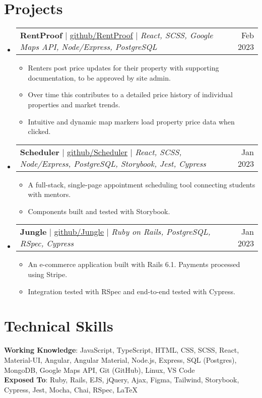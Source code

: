 \documentclass[letterpaper,11pt]{article}
\makeatletter
\newcommand{\resumeItem}[1]{
  \item\small{
    {#1 \vspace{-2pt}}
  }
}
\newcommand{\resumeProjectHeading}[2]{
    \item
    \begin{tabular*}{0.97\textwidth}{l@{\extracolsep{\fill}}r}
      \small#1 & #2 \\
    \end{tabular*}\vspace{-7pt}
}
\newcommand{\resumeSubHeadingListStart}{\begin{itemize}[leftmargin=0.15in, label={}]}
\newcommand{\resumeSubHeadingListEnd}{\end{itemize}}
\newcommand{\resumeItemListStart}{\begin{itemize}}
\newcommand{\resumeItemListEnd}{\end{itemize}\vspace{-5pt}}
\makeatother
\begin{document}
\section{Projects}
    \resumeSubHeadingListStart
      \resumeProjectHeading
          {\textbf{RentProof} $|$ 
          \href{https://github.com/JackDuluoz/RentProof}
          {\underline{github/RentProof}} $|$
          \emph{React, SCSS, Google Maps API, Node/Express, PostgreSQL}}{Feb 2023}
          \resumeItemListStart
            \resumeItem{Renters post price updates for their property with supporting documentation, to be approved by site admin.}
            \resumeItem{Over time this contributes to a detailed price history of individual properties and market trends.}
            \resumeItem{Intuitive and dynamic map markers load property price data when clicked.}
          \resumeItemListEnd
      \resumeProjectHeading
          {\textbf{Scheduler} $|$ 
          \href{https://github.com/JackDuluoz/scheduler}
          {\underline{github/Scheduler}} $|$
          \emph{React, SCSS, Node/Express, PostgreSQL, Storybook, Jest, Cypress}}{Jan 2023}
          \resumeItemListStart
            \resumeItem{A full-stack, single-page appointment scheduling tool connecting students with mentors.}
            \resumeItem{Components built and tested with Storybook.}
          \resumeItemListEnd
      \resumeProjectHeading
          {\textbf{Jungle} $|$ 
          \href{https://github.com/JackDuluoz/jungle-rails}
          {\underline{github/Jungle}} $|$
          \emph{Ruby on Rails, PostgreSQL, RSpec, Cypress}}{Jan 2023}
          \resumeItemListStart
            \resumeItem{An e-commerce application built with Rails 6.1. Payments processed using Stripe.}
            \resumeItem{Integration tested with RSpec and end-to-end tested with Cypress.}
          \resumeItemListEnd
    \resumeSubHeadingListEnd



%
\section{Technical Skills}
 \begin{itemize}[leftmargin=0.15in, label={}]
    \small{\item{
     \textbf{Working Knowledge}{: JavaScript, TypeScript, HTML, CSS, SCSS, React, Material-UI, Angular, Angular Material, Node.js, Express, SQL (Postgres), MongoDB, Google Maps API, Git (GitHub), Linux, VS Code} \\ \vspace{1.5pt}
     \textbf{Exposed To}{: Ruby, Rails, EJS, jQuery, Ajax, Figma, Tailwind, Storybook, Cypress, Jest, Mocha, Chai, RSpec, LaTeX} \\
    }}
 \end{itemize}


\end{document}
